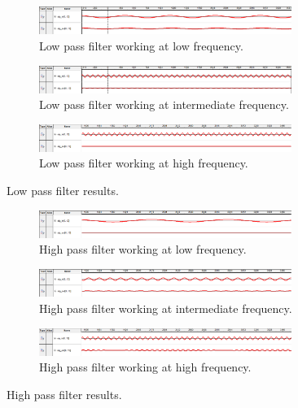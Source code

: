 \documentclass[12pt]{article}   	%
\begin{document}
\begin{figure}[!ht]
	\centering
	\begin{subfigure}[t]{\textwidth}
		\centering
		\includegraphics[width=0.9\textwidth]{img/lp_lf}
		\caption{Low pass filter working at low frequency.}
		\label{fig:lp_lf}
	\end{subfigure}%
	\hfill
	\begin{subfigure}[t]{\textwidth}
	\centering
	\includegraphics[width=0.9\textwidth]{img/lp_mf}
	\caption{Low pass filter working at intermediate frequency.}
	\label{fig:lp_mf}
\end{subfigure}%
\hfill
	\begin{subfigure}[t]{\textwidth}
	\centering
	\includegraphics[width=0.9\textwidth]{img/lp_fh}
	\caption{Low pass filter working at high frequency.}
	\label{fig:lp_hf}
\end{subfigure}%
	\caption{Low pass filter results.}
	\label{fig:lpr}
\end{figure}

\begin{figure}[!ht]
	\centering
	\begin{subfigure}[t]{\textwidth}
		\centering
		\includegraphics[width=0.9\textwidth]{img/hp_lf}
		\caption{High pass filter working at low frequency.}
		\label{fig:hp_lf}
	\end{subfigure}%
	\hfill
	\begin{subfigure}[t]{\textwidth}
		\centering
		\includegraphics[width=0.9\textwidth]{img/hp_mf}
		\caption{High pass filter working at intermediate frequency.}
		\label{fig:hp_mf}
	\end{subfigure}%
	\hfill
	\begin{subfigure}[t]{\textwidth}
		\centering
		\includegraphics[width=0.9\textwidth]{img/hp_hf}
		\caption{High pass filter working at high frequency.}
		\label{fig:hp_hf}
	\end{subfigure}%
	\caption{High pass filter results.}
	\label{fig:hpr}
\end{figure}
\end{document}
